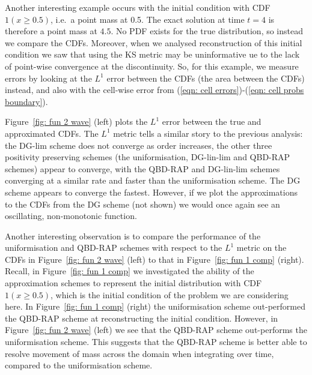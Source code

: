 \begin{example}\label{ex: wave 2}
Another interesting example occurs with the initial condition with CDF \(1(x\geq 0.5)\), i.e.~a point mass at 0.5. The exact solution at time \(t=4\) is therefore a point mass at \(4.5\). No PDF exists for the true distribution, so instead we compare the CDFs. Moreover, when we analysed reconstruction of this initial condition we saw that using the KS metric may be uninformative ue to the lack of point-wise convergence at the discontinuity. So, for this example, we measure errors by looking at the \(L^1\) error between the CDFs (the area between the CDFs) instead, and also with the cell-wise error from (\ref{eqn: cell errors})-(\ref{eqn: cell probs boundary}).

Figure~\ref{fig: fun 2 wave} (left) plots the \(L^1\) error between the true and approximated CDFs. The \(L^1\) metric tells a similar story to the previous analysis: the DG-lim scheme does not converge as order increases, the other three positivity preserving schemes (the uniformisation, DG-lin-lim and QBD-RAP schemes) appear to converge, with the QBD-RAP and DG-lin-lim schemes converging at a similar rate and faster than the uniformisation scheme. The DG scheme appears to converge the fastest. However, if we plot the approximations to the CDFs from the DG scheme (not shown) we would once again see an oscillating, non-monotonic function. 

Another interesting observation is to compare the performance of the uniformisation and QBD-RAP schemes with respect to the \(L^1\) metric on the CDFs in Figure~\ref{fig: fun 2 wave} (left) to that in Figure~\ref{fig: fun 1 comp} (right). Recall, in Figure~\ref{fig: fun 1 comp} we investigated the ability of the approximation schemes to represent the initial distribution with CDF \(1(x\geq 0.5)\), which is the initial condition of the problem we are considering here. In Figure~\ref{fig: fun 1 comp} (right) the uniformisation scheme out-performed the QBD-RAP scheme at reconstructing the initial condition. However, in Figure~\ref{fig: fun 2 wave} (left) we see that the QBD-RAP scheme out-performs the uniformisation scheme. This suggests that the QBD-RAP scheme is better able to resolve movement of mass across the domain when integrating over time, compared to the uniformisation scheme.  


\end{example}
